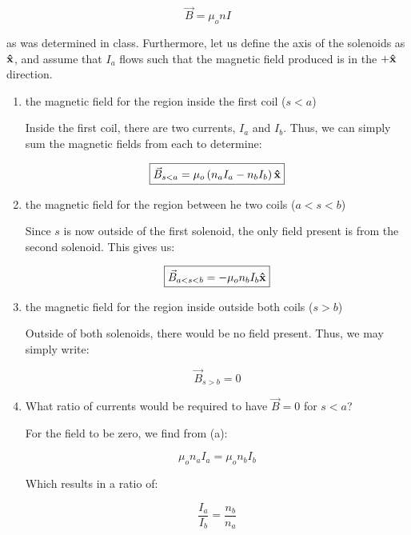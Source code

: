 \begin{enumerate}
    $$\vec{B}=\mu_onI$$

    as was determined in class. Furthermore, let us define the axis of the solenoids as $\bold{\hat{x}}$, and assume that $I_a$ flows such that the magnetic field produced is in the $+\bold{\hat{x}}$ direction.

    \begin{enumerate}

      \item the magnetic field for the region inside the first coil ($s<a$)

        Inside the first coil, there are two currents, $I_a$ and $I_b$. Thus, we can simply sum the magnetic fields from each to determine:

        $$\boxed{\vec{B}_{s<a}=\mu_o\left( n_aI_a-n_bI_b \right)\bold{\hat{x}}}$$

      \item the magnetic field for the region between he two coils ($a<s<b$)

        Since $s$ is now outside of the first solenoid, the only field present is from the second solenoid. This gives us:

        $$\boxed{\vec{B}_{a<s<b}=-\mu_on_bI_b\bold{\hat{x}}}$$

      \item the magnetic field for the region inside outside both coils ($s>b$)

        Outside of both solenoids, there would be no field present. Thus, we may simply write:

        $$\boxed{\vec{B}_{s>b}=0}$$

      \item What ratio of currents would be required to have $\vec{B}=0$ for $s<a$?

        For the field to be zero, we find from (a):

        $$\mu_on_aI_a=\mu_on_bI_b$$

        Which results in a ratio of:

        $$\boxed{\frac{I_a}{I_b}=\frac{n_b}{n_a}}$$

    \end{enumerate}

\end{enumerate}



